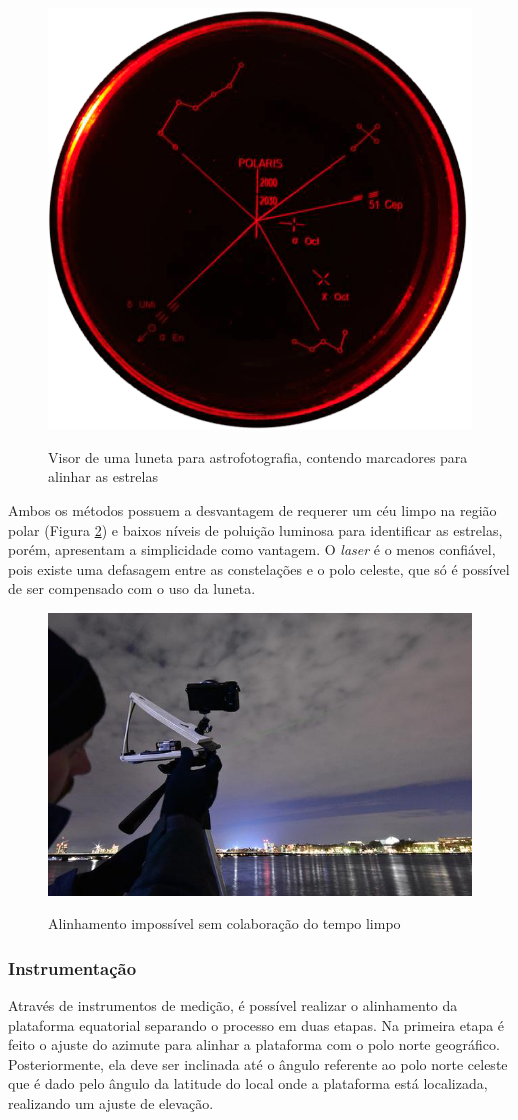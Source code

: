  \begin{figure}[!htb]
	\centering
	\caption{Visor de uma luneta para astrofotografia, contendo marcadores para alinhar as estrelas}
	\includegraphics[width=0.5\linewidth]{figuras/revisaobiblio/luneta}
	\label{fig:luneta}
\end{figure}

Ambos os métodos possuem a desvantagem de requerer um céu limpo na região polar (Figura \ref{fig:temporuim}) e baixos níveis de poluição luminosa para identificar as estrelas, porém, apresentam a simplicidade como vantagem. O \textit{laser} é o menos confiável, pois existe uma defasagem entre as constelações e o polo celeste, que só é possível de ser compensado com o uso da luneta. 

 \begin{figure}[!htb]
	\centering
	\caption{Alinhamento impossível sem colaboração do tempo limpo}
	\includegraphics[width=0.5\linewidth]{figuras/revisaobiblio/temporuim}
	\label{fig:temporuim}
\end{figure}


\subsubsection{Instrumentação}

Através de instrumentos de medição, é possível realizar o alinhamento da plataforma equatorial separando o processo em duas etapas. Na primeira etapa é feito o ajuste do azimute para alinhar a plataforma com o polo norte geográfico. Posteriormente, ela deve ser inclinada até o ângulo referente ao polo norte celeste que é dado pelo ângulo da latitude do local onde a plataforma está localizada, realizando um ajuste de elevação. 

